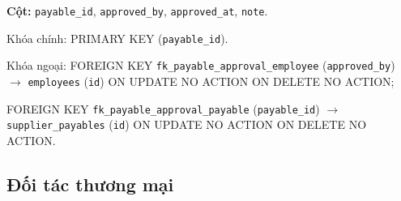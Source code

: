 \begin{description}[leftmargin=3.6cm,labelwidth=3.4cm,style=nextline]
\item[\texttt{supplier\_payable\_approvals}] \textbf{Cột:} \texttt{payable\_id}, \texttt{approved\_by}, \texttt{approved\_at}, \texttt{note}.

Khóa chính: PRIMARY KEY (\texttt{payable\_id}).

Khóa ngoại: FOREIGN KEY \texttt{fk\_payable\_approval\_employee} (\texttt{approved\_by}) $\rightarrow$ \texttt{employees} (\texttt{id}) ON UPDATE NO ACTION ON DELETE NO ACTION;\par FOREIGN KEY \texttt{fk\_payable\_approval\_payable} (\texttt{payable\_id}) $\rightarrow$ \texttt{supplier\_payables} (\texttt{id}) ON UPDATE NO ACTION ON DELETE NO ACTION.

\end{description}

\subsection{Đối tác thương mại}

